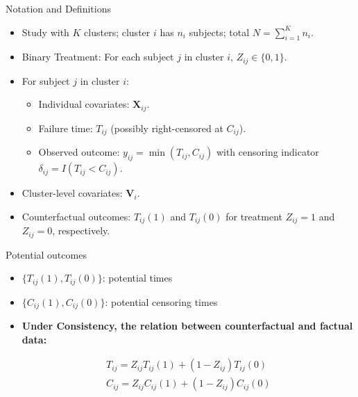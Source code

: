 \documentclass{beamer}
\begin{document}
\begin{frame}{Notation and Definitions}
  \begin{itemize}
    \item Study with \(K\) clusters; cluster \(i\) has \(n_i\) subjects; total \(N=\sum_{i=1}^{K} n_i\).
    \item Binary Treatment: For each subject \(j\) in cluster \(i\), \(Z_{ij}\in\{0,1\}\).
    \item For subject \(j\) in cluster \(i\):
      \begin{itemize}
        \item Individual covariates: \(\mathbf{X}_{ij}\).
        \item Failure time: \(T_{ij}\) (possibly right-censored at \(C_{ij}\)).
        \item Observed outcome: \(y_{ij}=\min(T_{ij}, C_{ij})\) with censoring indicator \(\delta_{ij}=I(T_{ij}<C_{ij})\).
      \end{itemize}
    \item Cluster-level covariates: \(\mathbf{V}_i\).
    \item Counterfactual outcomes: \(T_{ij}(1)\) and \(T_{ij}(0)\) for treatment \(Z_{ij}=1\) and \(Z_{ij}=0\), respectively.
  \end{itemize}
\end{frame}

\begin{frame}{Potential outcomes}
\begin{itemize}
\item $\{T_{ij}(1), T_{ij}(0)\}$: potential times
\item $\{C_{ij}(1), C_{ij}(0)\}$: potential censoring times


\item \textbf{Under Consistency, the relation between counterfactual and factual data:} %

\begin{align*} %
T_{ij} = Z_{ij} T_{ij}(1) + (1 - Z_{ij}) T_{ij}(0) \\
C_{ij} = Z_{ij} C_{ij}(1) + (1 - Z_{ij}) C_{ij}(0)
\end{align*}


\end{itemize} %
\end{frame}
\end{document}
